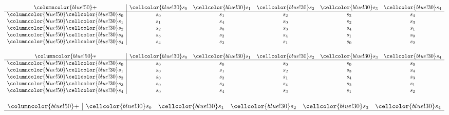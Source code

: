 \documentclass{article}
\begin{document}
\begin{center}
\begin{minipage}{0.23\textwidth}
    \centering
    \small{}
    \renewcommand{\arraystretch}{1} 
    \[
    \begin{array}{>{\columncolor{blue!50}}c|ccccc}
    + & \cellcolor{blue!30}s_0 & \cellcolor{blue!30}s_1 & \cellcolor{blue!30}s_2 & \cellcolor{blue!30}s_3 & \cellcolor{blue!30}s_4 \\ \hline
    \cellcolor{blue!30}s_0 & s_0 & s_1 & s_2 & s_3 & s_4 \\
    \cellcolor{blue!30}s_1 & s_1 & s_4 & s_0 & s_2 & s_3 \\
    \cellcolor{blue!30}s_2 & s_2 & s_0 & s_3 & s_4 & s_1 \\
    \cellcolor{blue!30}s_3 & s_3 & s_2 & s_4 & s_1 & s_0 \\
    \cellcolor{blue!30}s_4 & s_4 & s_3 & s_1 & s_0 & s_2 \\
    \end{array}
    \]
\end{minipage}%
\hfill
\begin{minipage}{0.23\textwidth}
    \centering
    \small{}
    \renewcommand{\arraystretch}{1} 
    \[
    \begin{array}{>{\columncolor{blue!50}}c|ccccc}
    * & \cellcolor{blue!30}s_0 & \cellcolor{blue!30}s_1 & \cellcolor{blue!30}s_2 & \cellcolor{blue!30}s_3 & \cellcolor{blue!30}s_4 \\ \hline
    \cellcolor{blue!30}s_0 & s_0 & s_0 & s_0 & s_0 & s_0 \\
    \cellcolor{blue!30}s_1 & s_0 & s_1 & s_2 & s_3 & s_4 \\
    \cellcolor{blue!30}s_2 & s_0 & s_2 & s_1 & s_4 & s_3 \\
    \cellcolor{blue!30}s_3 & s_0 & s_3 & s_4 & s_2 & s_1 \\
    \cellcolor{blue!30}s_4 & s_0 & s_4 & s_3 & s_1 & s_2 \\
    \end{array}
    \]
\end{minipage}%
\hspace{0.5cm}
\begin{minipage}{0.23\textwidth}
    \centering
    \small{}
    \renewcommand{\arraystretch}{1} 
    \[
    \begin{array}{>{\columncolor{blue!50}}c|ccccc}
    + & \cellcolor{blue!30}s_0 & \cellcolor{blue!30}s_1 & \cellcolor{blue!30}s_2 & \cellcolor{blue!30}s_3 & \cellcolor{blue!30}s_4 \\ \hline

\end{array}\]
\end{minipage}
\end{center}
\end{document}
